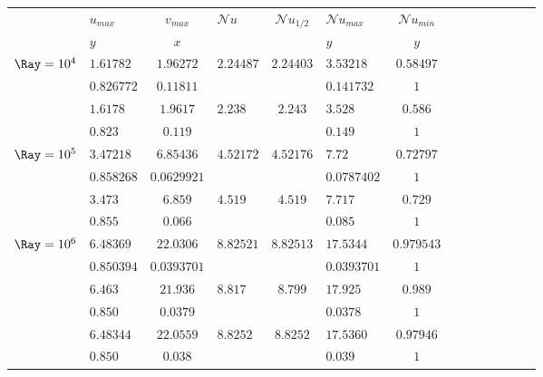 \begin{table}
   \begin{center}
      \begin{tabular}{*{7}{cl}}
          & $u_{max}$ & $v_{max}$ & \multirow{2}{*}{$\mathcal{N}\!u$} & \multirow{2}{*}{$\mathcal{N}\!u_{1/2}$} & $\mathcal{N}\!u_{max}$ & $\mathcal{N}\!u_{min}$ \\ 
          & $y$ & $x$ & &  & $y$ & $y$ \\ \bottomrule
          \multirow{2}{*}{$\Ray = 10^4$} & $1.61782$ & $1.96272$ & \multirow{2}{*}{$2.24487$} & \multirow{2}{*}{$2.24403 $} & $3.53218$ & $0.58497$  \\
          & $0.826772$ & $0.11811$ & & & $0.141732$ & $1$ \\
          \multirow{2}{*}{\cite{de1983natural}} & $1.6178$ & $1.9617$ & $2.238$ & $2.243 $ & $3.528$ & $0.586$  \\
          & $0.823$ & $0.119$ & & & $0.149$ & $1$ \\ \hline
           
          \multirow{2}{*}{$\Ray = 10^5$} & $3.47218$ & $6.85436$ & \multirow{2}{*}{$4.52172$} & \multirow{2}{*}{$4.52176 $} & $7.72$ & $0.72797$  \\
          & $0.858268$ & $0.0629921$ & & & $0.0787402$ & $1$ \\
         \multirow{2}{*}{\cite{de1983natural}} & $3.473$ & $6.859$ & \multirow{2}{*}{$4.519$} & \multirow{2}{*}{$4.519 $} & $7.717$ & $0.729$  \\
         & $0.855$ & $0.066$ & & & $0.085$ & $1$ \\ \hline
         
          \multirow{2}{*}{$\Ray = 10^6$} & $6.48369$ & $22.0306$ & \multirow{2}{*}{$8.82521$} & \multirow{2}{*}{$8.82513 $} & $17.5344$ & $0.979543$  \\
          & $0.850394$ & $0.0393701$ & & & $0.0393701$ & $1$ \\ 
          \multirow{2}{*}{\cite{de1983natural}} & $6.463$ & $21.936 $ & \multirow{2}{*}{$8.817$} & \multirow{2}{*}{$8.799 $} & $17.925$ & $0.989$  \\
          & $0.850$ & $0.0379$ & & & $0.0378$ & $1$ \\
          \multirow{2}{*}{\cite{LeQuere91}} & $6.48344$ & $22.0559 $ & \multirow{2}{*}{$8.8252$} & \multirow{2}{*}{$8.8252 $} & $17.5360$ & $0.97946$  \\
          & $0.850$ & $0.038$ & & & $0.039$ & $1$ \\ \hline
          

\end{tabular}
\end{center}
\end{table}
